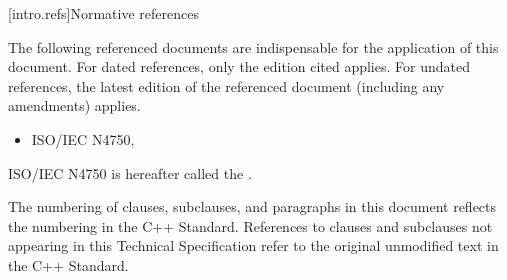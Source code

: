 
[intro.refs]{Normative references}

\pnum
The following referenced documents are indispensable for the application of this
document. For dated references, only the edition cited applies. For undated
references, the latest edition of the referenced document (including any
amendments) applies.

\begin{itemize}
\item ISO/IEC N4750, 
\end{itemize}

\pnum
ISO/IEC N4750 is hereafter called the .


\pnum
The numbering of clauses, subclauses, and paragraphs in this document reflects
the numbering in the C++ Standard.  References to clauses and subclauses not
appearing in this Technical Specification refer to the original unmodified text
in the C++ Standard.
